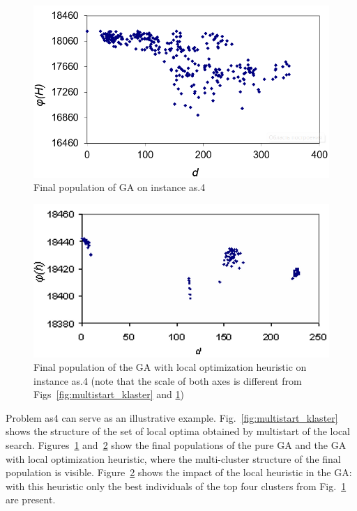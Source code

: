 \documentclass{ifacconf}
\begin{document}
 \begin{figure}[h!]
	\includegraphics[scale=0.5]{ga_klaster}
  \caption{Final population of GA on instance as.4} \label{fig:ga_klaster}
  \end{figure}
 \begin{figure}[h!]
\centering
	\hspace{1.6em} \includegraphics[scale=0.5]{gals_klaster}
  \caption{Final population of the GA with local optimization heuristic on instance as.4 \label{fig:gals_klaster} 
  (note that the scale of both axes is different from 
  Figs~\ref{fig:multistart_klaster} and \ref{fig:ga_klaster})}
  \end{figure}

Problem as4 can serve as an illustrative example. Fig.~\ref{fig:multistart_klaster} shows the structure 
of the set of local optima obtained by multistart  of the local search. 
Figures~\ref{fig:ga_klaster} and~\ref{fig:gals_klaster} show the final populations of the pure GA and the GA 
with local optimization heuristic, where the multi-cluster structure of the final population is visible. 
Figure~\ref{fig:gals_klaster} shows the impact of the local heuristic in the GA: with this heuristic only the best individuals 
of the top four clusters from Fig.~\ref{fig:ga_klaster} are present.
\end{document}
